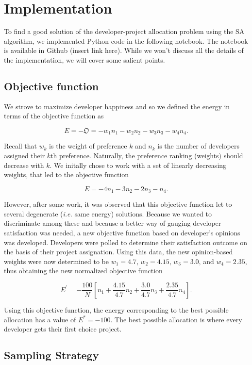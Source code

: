 \documentclass[11pt]{article}
\begin{document}
    \section{Implementation}\label{implementation}

To find a good solution of the developer-project allocation problem
using the SA algorithm, we implemented Python code in the following
notebook. The notebook is available in Github (insert link here). While
we won't discuss all the details of the implementation, we will cover
some salient points.

\subsection{Objective function}\label{objective-function}

We strove to maximize developer happiness and so we defined the energy
in terms of the objective function as

\[
E = -\mathfrak{O} = -w_1n_1 -w_2n_2 -w_3n_3 -w_4n_4.
\]

Recall that \(w_k\) is the weight of preference \(k\) and \(n_k\) is the
number of developers assigned their \(k\)th preference. Naturally, the
preference ranking (weights) should decrease with \(k\). We initally
chose to work with a set of linearly decreasing weights, that led to the
objective function

\[
E = -4n_1 -3n_2 - 2n_3 -n_4.
\]

However, after some work, it was observed that this objective function
let to several degenerate (\emph{i.e.} same energy) solutions. Because
we wanted to discriminate among these and because a better way of
gauging developer satisfaction was needed, a new objective function
based on developer's opinions was developed. Developers were polled to
determine their satisfaction outcome on the basis of their project
assignation. Using this data, the new opinion-based weights were now
determined to be \(w_1=4.7\), \(w_2=4.15\), \(w_3=3.0\), and
\(w_4=2.35\), thus obtaining the new normalized objective function

\[
E^\prime = -\dfrac{100}{N}\left[ n_1 + \dfrac{4.15}{4.7}n_2 + \dfrac{3.0}{4.7}n_3 + \dfrac{2.35}{4.7}n_4 \right].
\]

Using this objective function, the energy corresponding to the best
possible allocation has a value of \(E^* = -100\). The best possible
allocation is where every developer gets their first choice project.

\subsection{Sampling Strategy}\label{sampling-strategy}
\end{document}
